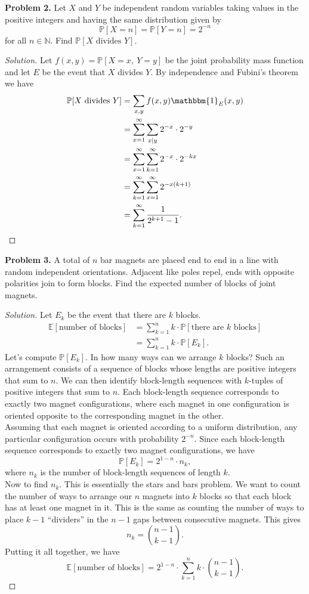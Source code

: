 \documentclass[11pt,letterpaper]{report}
\newcommand{\naturals}{\mathbb{N}}
\newcommand{\E}{\mathbb{E}}
\newcommand{\Prob}{\mathbb{P}}
\newcommand{\ind}{\mathbbm{1}}
\newenvironment{solution}
{\begin{proof}[Solution]}
{\end{proof}}
\begin{document}
\noindent\textbf{Problem 2. }
Let $X$ and $Y$ be independent random variables taking values in the positive integers and having the same distribution given by
\[
\Prob[X=n] = \Prob[Y=n] = 2^{-n}
\]
for all $n\in \naturals$. Find $\Prob[X\text{ divides }Y]$.
\begin{solution}
	Let $f(x,y) = \Prob[X=x,\ Y=y]$ be the joint probability mass function and let $E$ be the event that $X$ divides $Y$. By independence and Fubini's theorem we have
	\begin{align*}
		\Prob[X\text{ divides }Y] &= \sum_{x,y}f(x,y)\ind_E(x,y)\\
		&= \sum_{x=1}^\infty\sum_{x|y}2^{-x}\cdot 2^{-y}\\
		&= \sum_{x=1}^{\infty}\sum_{k=1}^\infty2^{-x}\cdot 2^{-kx}\\
		&= \sum_{k=1}^\infty\sum_{x=1}^\infty 2^{-x(k+1)}\\
		&= \sum_{k=1}^\infty\frac{1}{2^{k+1}-1}.
	\end{align*}
\end{solution}

\noindent\textbf{Problem 3. }
A total of $n$ bar magnets are placed end to end in a line with random independent orientations. Adjacent like poles repel, ends with opposite polarities join to form blocks. Find the expected number of blocks of joint magnets.
\begin{solution}
	Let $E_k$ be the event that there are $k$ blocks.
	\begin{align*}
		\E[\text{number of blocks}] &= \sum_{k=1}^nk\cdot \Prob[\text{there are $k$ blocks}]\\
		&= \sum_{k=1}^nk\cdot \Prob[E_k].
	\end{align*}
	Let's compute $\Prob[E_k]$. In how many ways can we arrange $k$ blocks? Such an arrangement consists of a sequence of blocks whose lengths are positive integers that sum to $n$. We can then identify block-length sequences with $k$-tuples of positive integers that sum to $n$. Each block-length sequence corresponds to exactly two magnet configurations, where each magnet in one configuration is oriented opposite to the corresponding magnet in the other.\\

	\noindent Assuming that each magnet is oriented according to a uniform distribution, any particular configuration occurs with probability $2^{-n}$. Since each block-length sequence corresponds to exactly two magnet configurations, we have
	\[
	\Prob[E_k] = 2^{1-n}\cdot n_k,
	\]
	where $n_k$ is the number of block-length sequences of length $k$.\\

	\noindent Now to find $n_k$. This is essentially the stars and bars problem. We want to count the number of ways to arrange our $n$ magnets into $k$ blocks so that each block has at least one magnet in it. This is the same as counting the number of ways to place $k-1$ ``dividers'' in the $n-1$ gaps between consecutive magnets. This gives
	\[
	n_k = \binom{n-1}{k-1}.
	\]
	Putting it all together, we have
	\[
	\E[\text{number of blocks}] = 2^{1-n}\cdot \sum_{k=1}^nk\cdot \binom{n-1}{k-1}.
	\]
\end{solution}
\end{document}
